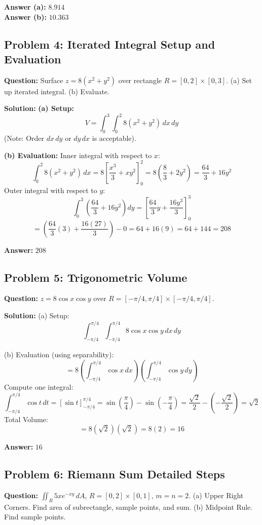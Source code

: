 \documentclass[11pt,a4paper]{article}
\begin{document}
\textbf{Answer (a):} $8.914$ \\
\textbf{Answer (b):} $10.363$

\subsection*{Problem 4: Iterated Integral Setup and Evaluation}
\textbf{Question:} Surface $z = 8(x^2+y^2)$ over rectangle $R = [0,2] \times [0,3]$.
(a) Set up iterated integral.
(b) Evaluate.

\textbf{Solution:}
\textbf{(a) Setup:}
\[ V = \int_0^3 \int_0^2 8(x^2+y^2) \, dx \, dy \]
(Note: Order $dx \, dy$ or $dy \, dx$ is acceptable).

\textbf{(b) Evaluation:}
Inner integral with respect to $x$:
\[ \int_0^2 8(x^2+y^2) \, dx = 8 \left[ \frac{x^3}{3} + xy^2 \right]_0^2 = 8 \left( \frac{8}{3} + 2y^2 \right) = \frac{64}{3} + 16y^2 \]
Outer integral with respect to $y$:
\[ \int_0^3 \left( \frac{64}{3} + 16y^2 \right) dy = \left[ \frac{64}{3}y + \frac{16y^3}{3} \right]_0^3 \]
\[ = \left( \frac{64}{3}(3) + \frac{16(27)}{3} \right) - 0 = 64 + 16(9) = 64 + 144 = 208 \]

\textbf{Answer:} $208$

\subsection*{Problem 5: Trigonometric Volume}
\textbf{Question:} $z = 8 \cos x \cos y$ over $R = [-\pi/4, \pi/4] \times [-\pi/4, \pi/4]$.

\textbf{Solution:}
(a) Setup:
\[ \int_{-\pi/4}^{\pi/4} \int_{-\pi/4}^{\pi/4} 8 \cos x \cos y \, dx \, dy \]

(b) Evaluation (using separability):
\[ = 8 \left( \int_{-\pi/4}^{\pi/4} \cos x \, dx \right) \left( \int_{-\pi/4}^{\pi/4} \cos y \, dy \right) \]
Compute one integral:
\[ \int_{-\pi/4}^{\pi/4} \cos t \, dt = [\sin t]_{-\pi/4}^{\pi/4} = \sin(\frac{\pi}{4}) - \sin(-\frac{\pi}{4}) = \frac{\sqrt{2}}{2} - \left(-\frac{\sqrt{2}}{2}\right) = \sqrt{2} \]
Total Volume:
\[ = 8 (\sqrt{2}) (\sqrt{2}) = 8(2) = 16 \]

\textbf{Answer:} $16$

\subsection*{Problem 6: Riemann Sum Detailed Steps}
\textbf{Question:} $\iint_R 5xe^{-xy} \, dA$, $R=[0,2] \times [0,1]$, $m=n=2$.
(a) Upper Right Corners. Find area of subrectangle, sample points, and sum.
(b) Midpoint Rule. Find sample points.
\end{document}
